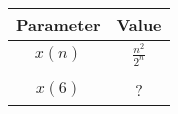  \begin{tabular}{|c|c|}
        \hline
        \textbf{Parameter} & \textbf{Value} \\
        \hline
        \(x(n)\) & \(\frac{n^2}{2^n}\) \\ \\
        \(x(6)\) & ? \\
        \hline
    \end{tabular}
